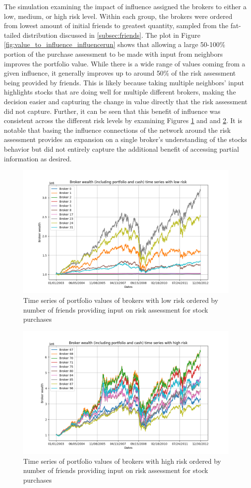 \documentclass[letterpaper, 11 pt, proceedings]{IEEEtran}
\begin{document}
	The simulation examining the impact of influence assigned the brokers to either a low, medium, or high risk level. Within each group, the brokers were ordered from lowest amount of initial friends to greatest quantity, sampled from the fat-tailed distribution discussed in \ref{subsec:friends}. The plot in Figure \ref{fig:value_to_influence_influencerun} shows that allowing a large 50-100\% portion of the purchase assessment to be made with input from neighbors improves the portfolio value. While there is a wide range of values coming from a given influence, it generally improves up to around 50\% of the risk assessment being provided by friends. This is likely because taking multiple neighbors' input highlights stocks that are doing well for multiple different brokers, making the decision easier and capturing the change in value directly that the risk assessment did not capture. Further, it can be seen that this benefit of influence was consistent across the different risk levels by examining Figures \ref{fig:low_risk_influence_time_series} and  and \ref{fig:high_risk_influence_time_series}. It is notable that basing the influence connections of the network around the risk assessment provides an expansion on a single broker's understanding of the stocks behavior  but did not entirely capture the additional benefit of accessing partial information as desired.
	
	\begin{figure}[h]
		\centering
		\includegraphics[width=.5\textwidth]{timeSeriesJoint_influenceRun04_LowRisk.png}
		\caption{Time series of portfolio values of brokers with low risk ordered by number of friends providing input on risk assessment for stock purchases}
		\label{fig:low_risk_influence_time_series}
	\end{figure}	
	\FloatBarrier
	
	\begin{figure}[h]
		\centering
		\includegraphics[width=.5\textwidth]{timeSeriesJoint_influenceRun04_HighRisk.png}
		\caption{Time series of portfolio values of brokers with high risk ordered by number of friends providing input on risk assessment for stock purchases}
		\label{fig:high_risk_influence_time_series}
	\end{figure}	
	\FloatBarrier
	
\end{document}
